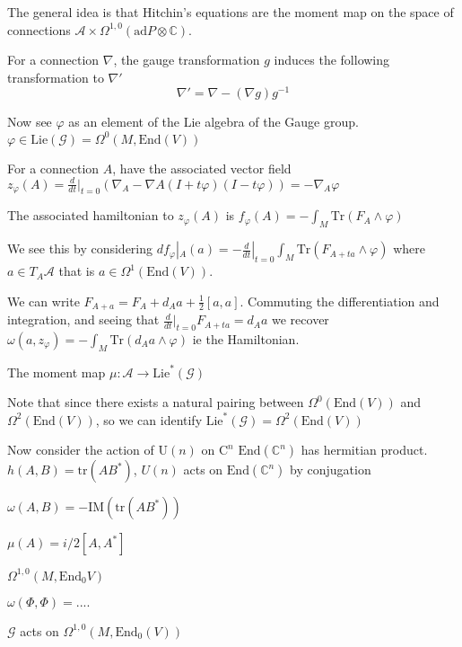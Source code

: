 The general idea is that Hitchin's equations are the moment map on the space of connections $\mathcal{A} \times \Omega^{1,0} ( \mathrm{ad}P \otimes \mathbb{C} ) $. 

For a connection $\nabla$, the gauge transformation $g$ induces the following transformation to $\nabla'$
\begin{equation}
    \nabla' = \nabla  - ( \nabla  g ) g^{-1} 
\end{equation}

Now see $ \varphi $ as an element of the Lie algebra of the Gauge group. 
$ \varphi \in \mathrm{Lie} ( \mathcal{G} ) = \Omega^0 (M, \mathrm{End} ( V)) $

For a connection $A$, have the associated vector field
$ z_\varphi ( A) = \frac{d}{dt} |_{t=0 } ( \nabla_A - \nabla{A} ( I + t \varphi ) ( I -t \varphi) ) = - \nabla_A \varphi $

The associated hamiltonian to $z_\varphi ( A)$ is  
$ f_\varphi (A) = - \int_M \mathrm{Tr} (F_A \wedge \varphi ) $

We see this by considering
$ d f_\varphi |_A (a) = - \frac{d}{dt} |_{t=0} \int_M \mathrm{Tr} ( F_{A+t a} \wedge \varphi) $
where $a \in T_A \mathcal{A} $ that is $ a \in \Omega^1(\mathrm{End}(V) ) $.  

We can write
$F_{A+a } = F_A + d_A a + \frac{1}{2} [a,a ]$. 
Commuting the differentiation and integration, 
and seeing that $ \frac{d}{dt}|_{t=0} F_{A+ta} = d_A a  $
we recover $ \omega ( a , z_\varphi) =  - \int_M \mathrm{Tr} (d_A a \wedge \varphi)  $ ie the Hamiltonian. 

The moment map
$\mu : \mathcal{A} \rightarrow  \mathrm{Lie}^* ( \mathcal{G} )$ 

Note that since there exists a natural pairing between $ \Omega ^0 ( \mathrm{End}(V))$ and $ \Omega ^2 ( \mathrm{End}(V)) $, so we can identify 
$ \mathrm{Lie}^*(\mathcal{G}) = \Omega ^2 ( \mathrm{End}(V))$ 


Now consider the action of $\mathrm{U} ( n) $ on $\mathrm{C} ^n $ 
$ \mathrm{End} (\mathbb{C} ^n) $ has hermitian product.
$h(A,B) = \mathrm{tr} ( AB^*) $,
$U(n) $ acts on $ \mathrm{End} ( \mathbb{C} ^n) $ by conjugation 

$\omega(A,B) = - \mathrm{IM}(\mathrm{tr}( AB^*)) $

$ \mu (A) = i/2 [ A, A^*] $ 

$ \Omega^{1,0} ( M, \mathrm{End}_0 V ) $

$\omega(\Phi, \Phi )  = .... $ 

$\mathcal{G} $ acts on $ \Omega^{1,0}( M, \mathrm{End} _0 (V) ) $

